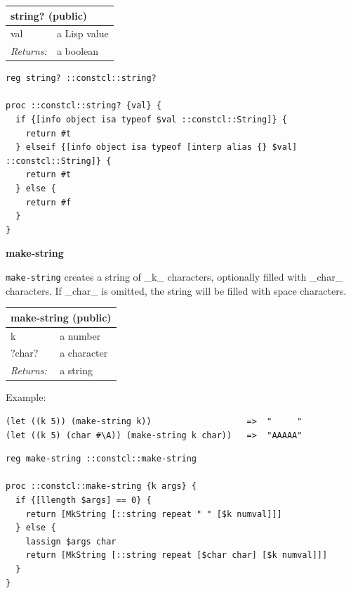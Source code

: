 \documentclass[twoside,9pt]{report}
\begin{document}
\noindent\makebox[\linewidth]{\rule{\linewidth}{0.4pt}}
\begin{tabular}{ |l l| }
\hline
\multicolumn{2}{|l|}{string? (public)} \\
\hline
val & a Lisp value \\
\textit{Returns:} & a boolean \\
\hline
\end{tabular}

\noindent\makebox[\linewidth]{\rule{\linewidth}{0.4pt}}
\begin{lstlisting}
reg string? ::constcl::string?
 
proc ::constcl::string? {val} {
  if {[info object isa typeof $val ::constcl::String]} {
    return #t
  } elseif {[info object isa typeof [interp alias {} $val] ::constcl::String]} {
    return #t
  } else {
    return #f
  }
}
\end{lstlisting}
\noindent\makebox[\linewidth]{\rule{\linewidth}{0.4pt}}

\textbf{make-string}


\texttt{make-string} creates a string of \_k\_ characters, optionally filled with \_char\_ characters. If \_char\_ is omitted, the string will be filled with space characters.

\begin{tabular}{ |l l| }
\hline
\multicolumn{2}{|l|}{make-string (public)} \\
\hline
k & a number \\
?char? & a character \\
\textit{Returns:} & a string \\
\hline
\end{tabular}


Example:

\noindent\makebox[\linewidth]{\rule{\linewidth}{0.4pt}}
\begin{lstlisting}
(let ((k 5)) (make-string k))                   =>  "     "
(let ((k 5) (char #\A)) (make-string k char))   =>  "AAAAA"
\end{lstlisting}
\noindent\makebox[\linewidth]{\rule{\linewidth}{0.4pt}}
\noindent\makebox[\linewidth]{\rule{\linewidth}{0.4pt}}
\begin{lstlisting}
reg make-string ::constcl::make-string
 
proc ::constcl::make-string {k args} {
  if {[llength $args] == 0} {
    return [MkString [::string repeat " " [$k numval]]]
  } else {
    lassign $args char
    return [MkString [::string repeat [$char char] [$k numval]]]
  }
}
\end{lstlisting}
\noindent\makebox[\linewidth]{\rule{\linewidth}{0.4pt}}
\end{document}
